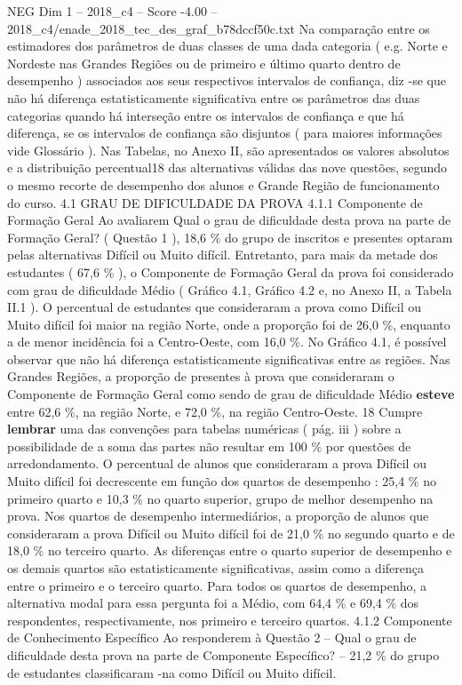 \begin{textsample}{NEG Dim 1 – 2018\_c4 – Score -4.00 – 2018\_c4/enade\_2018\_tec\_des\_graf\_b78dccf50c.txt}
Na comparação entre os estimadores dos parâmetros de duas classes de uma dada categoria ( e.g.
Norte e Nordeste nas Grandes Regiões ou de primeiro e último quarto dentro de desempenho ) associados aos seus respectivos intervalos de confiança, diz -se que não há diferença estatisticamente significativa entre os parâmetros das duas categorias quando há interseção entre os intervalos de confiança e que há diferença, se os intervalos de confiança são disjuntos ( para maiores informações vide Glossário ).
Nas Tabelas, no Anexo II, são apresentados os valores absolutos e a distribuição percentual18 das alternativas válidas das nove questões, segundo o mesmo recorte de desempenho dos alunos e Grande Região de funcionamento do curso. 4.1 GRAU DE DIFICULDADE DA PROVA 4.1.1 Componente de Formação Geral Ao avaliarem Qual o grau de dificuldade desta prova na parte de Formação Geral? ( Questão 1 ), 18,6 \% do grupo de inscritos e presentes optaram pelas alternativas Difícil ou Muito difícil.
Entretanto, para mais da metade dos estudantes ( 67,6 \% ), o Componente de Formação Geral da prova foi considerado com grau de dificuldade Médio ( Gráfico 4.1, Gráfico 4.2 e, no Anexo II, a Tabela II.1 ).
O percentual de estudantes que consideraram a prova como Difícil ou Muito difícil foi maior na região Norte, onde a proporção foi de 26,0 \%, enquanto a de menor incidência foi a Centro-Oeste, com 16,0 \%.
No Gráfico 4.1, é possível observar que não há diferença estatisticamente significativas entre as regiões.
Nas Grandes Regiões, a proporção de presentes à prova que consideraram o Componente de Formação Geral como sendo de grau de dificuldade Médio \textbf{esteve} entre 62,6 \%, na região Norte, e 72,0 \%, na região Centro-Oeste. 18 Cumpre \textbf{lembrar} uma das convenções para tabelas numéricas ( pág. iii ) sobre a possibilidade de a soma das partes não resultar em 100 \% por questões de arredondamento.
O percentual de alunos que consideraram a prova Difícil ou Muito difícil foi decrescente em função dos quartos de desempenho : 25,4 \% no primeiro quarto e 10,3 \% no quarto superior, grupo de melhor desempenho na prova.
Nos quartos de desempenho intermediários, a proporção de alunos que consideraram a prova Difícil ou Muito difícil foi de 21,0 \% no segundo quarto e de 18,0 \% no terceiro quarto.
As diferenças entre o quarto superior de desempenho e os demais quartos são estatisticamente significativas, assim como a diferença entre o primeiro e o terceiro quarto.
Para todos os quartos de desempenho, a alternativa modal para essa pergunta foi a Médio, com 64,4 \% e 69,4 \% dos respondentes, respectivamente, nos primeiro e terceiro quartos. 4.1.2 Componente de Conhecimento Específico Ao responderem à Questão 2 – Qual o grau de dificuldade desta prova na parte de Componente Específico? – 21,2 \% do grupo de estudantes classificaram -na como Difícil ou Muito difícil.

\end{textsample}
